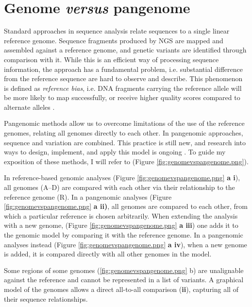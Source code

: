 \section{Genome \textit{versus} pangenome}

Standard approaches in sequence analysis relate sequences to a single linear reference genome. Sequence fragments produced by NGS are mapped and assembled against a reference genome, and genetic variants are identified through comparison with it. While this is an efficient way of processing sequence information, the approach has a fundamental problem, i.e. substantial difference from the reference sequence are hard to observe and describe. This phenomenon is defined as \textit{reference bias}, i.e.  DNA fragments carrying the reference allele will be more likely to map successfully, or receive higher quality scores compared to alternate alleles \cite{eizenga2020pangenome}.


Pangenomic methods allow us to overcome limitations of the use of the reference genomes, relating all genomes directly to each other. In pangenomic approaches, sequence and variation are combined. This practice is still new, and research into ways to design, implement, and apply this model is ongoing \cite{eizenga2020pangenome}.
To guide my exposition of these methods, I will refer to (Figure \ref{fig:genomevspangenome.png}).


In reference-based genomic analyses (Figure \ref{fig:genomevspangenome.png} \textbf{a i}), all genomes (A–D) are compared with each other via their relationship to the reference genome (R).
In a pangenomic analyses (Figure \ref{fig:genomevspangenome.png} \textbf{a ii)},  all genomes are compared to each other, from which a particular reference is chosen arbitrarily. 
When extending the analysis with a new genome, (Figure \ref{fig:genomevspangenome.png} \textbf{a iii}) one adds it to the genomic model by comparing it with the reference genome.
In a pangenomic analyses instead (Figure \ref{fig:genomevspangenome.png} \textbf{a iv}), when a new genome is added, it is compared directly with all other genomes in the model.
 
Some regions of some genomes (\ref{fig:genomevspangenome.png} b) are unalignable against the reference and cannot be represented in a list of variants. A graphical model of the genomes allows a direct all-to-all comparison (\textbf{ii}), capturing all of their sequence relationships.

